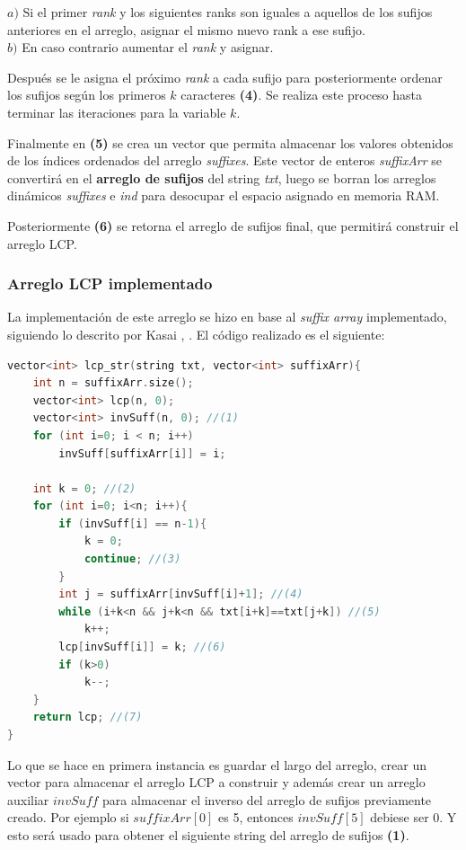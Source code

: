 $a)$ Si el primer \textit{rank} y los siguientes ranks son iguales a aquellos de los sufijos anteriores en el arreglo, asignar el mismo nuevo rank a ese sufijo.\\
$b)$ En caso contrario aumentar el \textit{rank} y asignar.

Después se le asigna el próximo \textit{rank} a cada sufijo para posteriormente ordenar los sufijos según los primeros $k$ caracteres \textbf{(4)}. Se realiza este proceso hasta terminar las iteraciones para la variable $k$.

Finalmente en \textbf{(5)} se crea un vector que permita almacenar los valores obtenidos de los índices ordenados del arreglo \textit{suffixes}. Este vector de enteros \textit{suffixArr} se convertirá en el \textbf{arreglo de sufijos} del string \textit{txt}, luego se borran los arreglos dinámicos \textit{suffixes} e \textit{ind} para desocupar el espacio asignado en memoria RAM.

Posteriormente \textbf{(6)} se retorna el arreglo de sufijos final, que permitirá construir el arreglo LCP.

\subsubsection{Arreglo LCP implementado}

La implementación de este arreglo se hizo en base al \textit{suffix array} implementado, siguiendo lo descrito por Kasai \cite{kasaimethod}, \cite{kasai}. El código realizado es el siguiente:

\begin{lstlisting}[language=C++, caption=Función principal arreglo LCP (1).]
vector<int> lcp_str(string txt, vector<int> suffixArr){
	int n = suffixArr.size();
	vector<int> lcp(n, 0);
	vector<int> invSuff(n, 0); //(1)
	for (int i=0; i < n; i++)
		invSuff[suffixArr[i]] = i;

	int k = 0; //(2)
	for (int i=0; i<n; i++){
		if (invSuff[i] == n-1){
			k = 0;
			continue; //(3)
		}
		int j = suffixArr[invSuff[i]+1]; //(4)
		while (i+k<n && j+k<n && txt[i+k]==txt[j+k]) //(5)
			k++;
		lcp[invSuff[i]] = k; //(6)
		if (k>0)
			k--;
	}
	return lcp; //(7)
}

\end{lstlisting}

Lo que se hace en primera instancia es guardar el largo del arreglo, crear un vector para almacenar el arreglo LCP a construir y además crear un arreglo auxiliar $invSuff$ para almacenar el inverso del arreglo de sufijos previamente creado. Por ejemplo si $suffixArr[0]$ es 5, entonces $invSuff[5]$ debiese ser 0. Y esto será usado para obtener el siguiente string del arreglo de sufijos \textbf{(1)}.

